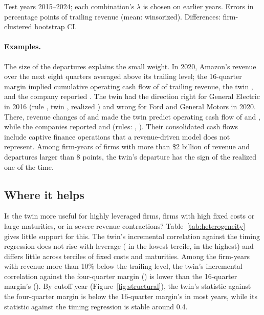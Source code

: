 \documentclass[11pt]{article}
\begin{document}
\begin{table}[t]
\centering\footnotesize
\caption{Out-of-sample combinations}
\label{tab:hybrid}

\par\smallskip
\begin{minipage}{\linewidth}\footnotesize
Test years 2015--2024; each combination's $\lambda$ is chosen on earlier years. Errors in percentage points of trailing revenue (mean: winsorized). Differences: firm-clustered bootstrap CI.
\end{minipage}
\end{table}

\paragraph{Examples.} The size of the departures explains the small weight. In 2020, Amazon's revenue over the next eight quarters averaged \ExAmznRev{} above its trailing level; the 16-quarter margin implied cumulative operating cash flow of \ExAmznRule{} of trailing revenue, the twin \ExAmznTwin, and the company reported \ExAmznReal. The twin had the direction right for General Electric in 2016 (rule \ExGeRule, twin \ExGeTwin, realized \ExGeReal) and wrong for Ford and General Motors in 2020. There, revenue changes of \ExFordRev{} and \ExGmRev{} made the twin predict operating cash flow of \ExFordTwin{} and \ExGmTwin{}, while the companies reported \ExFordReal{} and \ExGmReal{} (rules: \ExFordRule, \ExGmRule). Their consolidated cash flows include captive finance operations that a revenue-driven model does not represent. Among firm-years of firms with more than \$2 billion of revenue and departures larger than 8 points, the twin's departure has the sign of the realized one \ExRightSign{} of the time.

\subsection{Where it helps}
Is the twin more useful for highly leveraged firms, firms with high fixed costs or large maturities, or in severe revenue contractions? Table~\ref{tab:heterogeneity} gives little support for this. The twin's incremental correlation against the timing regression does not rise with leverage (\HetLevLowTwinReg{} in the lowest tercile, \HetLevHighTwinReg{} in the highest) and differs little across terciles of fixed costs and maturities. Among the \HetDownN{} firm-years with revenue more than 10\% below the trailing level, the twin's incremental correlation against the four-quarter margin (\HetDownTwin) is lower than the 16-quarter margin's (\HetDownSixteen). By cutoff year (Figure~\ref{fig:structural}), the twin's statistic against the four-quarter margin is below the 16-quarter margin's in most years, while its statistic against the timing regression is stable around 0.4.
\end{document}
